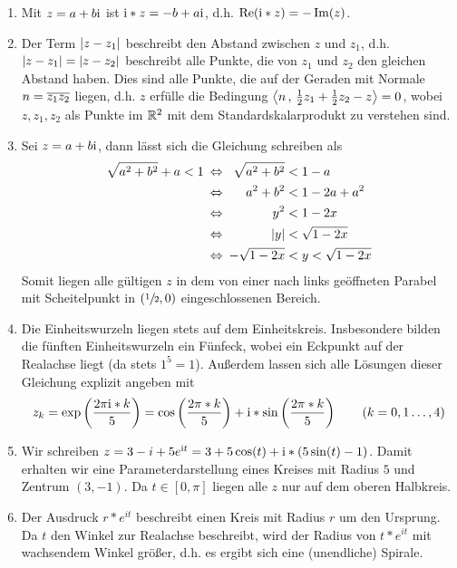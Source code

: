 \begin{exercisePage}
\begin{enumerate}[leftmargin=*, label=(zu \alph*)]
	\item Mit $z = a + b\mathrm{i}$ ist $\mathrm{i}*z = -b + a\mathrm{i}$, d.h. $\operatorname{Re}(\mathrm{i} * z) = - \operatorname{Im}(z)$.
	\item Der Term $\left| z - z_1 \right|$ beschreibt den Abstand zwischen $z$ und $z_1$, d.h.  $\left| z - z_1 \right| = \left| z - z_2 \right|$ beschreibt alle Punkte, die von $z_1$ und $z_2$ den gleichen Abstand haben. Dies sind alle Punkte, die auf der Geraden mit Normale $n = \overline{z_1z_2}$ liegen, d.h. $z$ erfülle die Bedingung $\left\langle n\, ,\, \frac{1}{2} z_1 + \frac{1}{2} z_2 - z \right\rangle = 0$, wobei $z, z_1, z_2$ als Punkte im $\mathbb{R}^2$ mit dem Standardskalarprodukt zu verstehen sind.
	\item Sei $z = a + b\mathrm{i}$, dann lässt sich die Gleichung schreiben als
	\begin{equation*}
		\begin{alignedat}{3}
			\sqrt{a^2 + b^2} + a &< 1 &\enskip \Leftrightarrow \enskip& &\sqrt{a^2 + b^2} &< 1 - a \\
			&&\enskip \Leftrightarrow \enskip& &a^2 + b^2 &< 1 - 2a + a^2 \\
			&&\enskip \Leftrightarrow \enskip& &y^2 &< 1 - 2x \\
			&&\enskip \Leftrightarrow \enskip& &\left| y \right| &< \sqrt{1 - 2x} \\
			&&\enskip \Leftrightarrow \enskip& &-\sqrt{1 - 2x}  &< y < \sqrt{1 - 2x} 
		\end{alignedat}
	\end{equation*}
	Somit liegen alle gültigen $z$ in dem von einer nach links geöffneten Parabel mit Scheitelpunkt in $(\sfrac{1}{2}, 0)$ eingeschlossenen Bereich.
	\item Die Einheitswurzeln liegen stets auf dem Einheitskreis. Insbesondere bilden die fünften Einheitswurzeln ein Fünfeck, wobei ein Eckpunkt auf der Realachse liegt (da stets $1^5 = 1$). Außerdem lassen sich alle Lösungen dieser Gleichung explizit angeben mit
	\begin{equation*}
		z_k = \exp\left( \frac{2\pi \mathrm{i} * k}{5} \right) = \cos\left( \frac{2\pi * k}{5} \right) + \mathrm{i} * \sin\left( \frac{2\pi * k}{5} \right) \qquad (k = 0, 1 \dots, 4)
	\end{equation*}
	\item Wir schreiben $z= 3 - i +5e^{\mathrm{i} t} = 3 + 5 \cos(t) +\mathrm{i} * \left( 5\sin(t) - 1 \right)$. Damit erhalten wir eine Parameterdarstellung eines Kreises mit Radius $5$ und Zentrum $(3,-1)$. Da $t \in [0,\pi]$ liegen alle $z$ nur auf dem oberen Halbkreis.
	\item Der Ausdruck $r * e^{it}$ beschreibt einen Kreis mit Radius $r$ um den Ursprung. Da $t$ den Winkel zur Realachse beschreibt, wird der Radius von $t * e^{it}$ mit wachsendem Winkel größer, d.h. es ergibt sich eine (unendliche) Spirale.
\end{enumerate}


\end{exercisePage}
